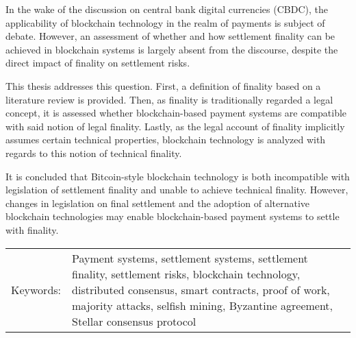 In the wake of the discussion on central bank digital currencies (CBDC), the applicability of blockchain technology in the realm of payments is subject of debate.
However, an assessment of whether and how settlement finality can be achieved in blockchain systems is largely absent from the discourse, despite the direct impact of finality on settlement risks.

This thesis addresses this question.
First, a definition of finality based on a literature review is provided.
Then, as finality is traditionally regarded a legal concept, it is assessed whether blockchain-based payment systems are compatible with said notion of legal finality.
Lastly, as the legal account of finality implicitly assumes certain technical properties, blockchain technology is analyzed with regards to this notion of technical finality.

It is concluded that Bitcoin-style blockchain technology is both incompatible with legislation of settlement finality and unable to achieve technical finality.
However, changes in legislation on final settlement and the adoption of alternative blockchain technologies may enable blockchain-based payment systems to settle with finality.




\begin{tabularx}{\textwidth}{@{}l X}
  Keywords: & Payment systems, settlement systems, settlement finality, settlement risks, blockchain technology, distributed consensus, smart contracts, proof of work, majority attacks, selfish mining, Byzantine agreement, Stellar consensus protocol
\end{tabularx}
